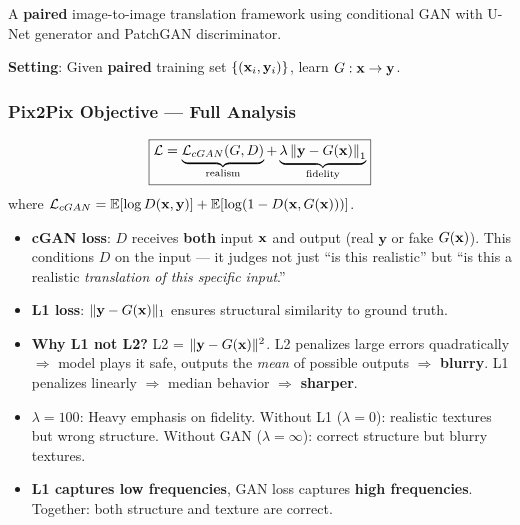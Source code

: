 \begin{definition}
A \textbf{paired} image-to-image translation framework using conditional GAN with U-Net generator and PatchGAN discriminator.
\end{definition}

\textbf{Setting}: Given \textbf{paired} training set $\{(\mathbf{x}_i, \mathbf{y}_i)\}$, learn $G: \mathbf{x} \to \mathbf{y}$.

\subsubsection{Pix2Pix Objective — Full Analysis}
\begin{equation}\label{eq:pix2pix}
\boxed{\mathcal{L} = \underbrace{\mathcal{L}_{cGAN}(G,D)}_{\text{realism}} + \underbrace{\lambda \left\|\mathbf{y} - G(\mathbf{x})\right\|_1}_{\text{fidelity}}}
\end{equation}
where $\mathcal{L}_{cGAN} = \mathbb{E}[\log D(\mathbf{x}, \mathbf{y})] + \mathbb{E}[\log(1-D(\mathbf{x}, G(\mathbf{x})))]$.

\begin{keybox}
\begin{itemize}
\item \textbf{cGAN loss}: $D$ receives \textbf{both} input $\mathbf{x}$ and output (real $\mathbf{y}$ or fake $G(\mathbf{x})$). This conditions $D$ on the input — it judges not just ``is this realistic'' but ``is this a realistic \emph{translation of this specific input}.''
\item \textbf{L1 loss}: $\|\mathbf{y} - G(\mathbf{x})\|_1$ ensures structural similarity to ground truth.
\item \textbf{Why L1 not L2?} L2 = $\|\mathbf{y}-G(\mathbf{x})\|^2$. L2 penalizes large errors quadratically $\Rightarrow$ model plays it safe, outputs the \emph{mean} of possible outputs $\Rightarrow$ \textbf{blurry}. L1 penalizes linearly $\Rightarrow$ median behavior $\Rightarrow$ \textbf{sharper}.
\item \textbf{$\lambda = 100$}: Heavy emphasis on fidelity. Without L1 ($\lambda{=}0$): realistic textures but wrong structure. Without GAN ($\lambda{=}\infty$): correct structure but blurry textures.
\item \textbf{L1 captures low frequencies}, GAN loss captures \textbf{high frequencies}. Together: both structure and texture are correct.
\end{itemize}
\end{keybox}

